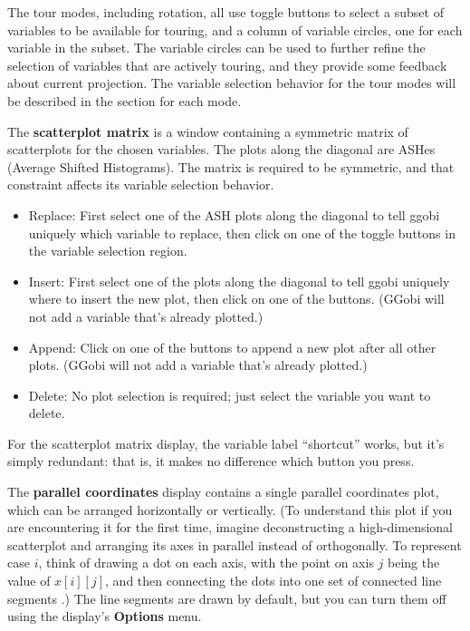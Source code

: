 \documentclass[11pt]{article}
\def\Widget#1{\textbf{#1}}
\begin{document}
The tour modes, including rotation, all use toggle buttons to select
a subset of variables to be available for touring, and a column of
variable circles, one for each variable in the subset.  The variable
circles can be used to further refine the selection of variables that are
actively touring, and they provide some feedback about current projection.
The variable selection behavior for the tour modes will be described in
the section for each mode.

The \Widget{scatterplot matrix} is a window containing a symmetric matrix
of scatterplots for the chosen variables.  The plots along the diagonal
are ASHes (Average Shifted Histograms).  The matrix is required to be
symmetric, and that constraint affects its variable selection behavior.

\begin{itemize}
\item Replace:  First select one of the ASH plots along the diagonal
  to tell ggobi uniquely which variable to replace, then click on
  one of the toggle buttons in the variable selection region.
\item Insert:  First select one of the plots along the
  diagonal to tell ggobi uniquely where to insert the new plot,
  then click on one of the buttons.  (GGobi will
  not add a variable that's already plotted.)
\item Append:  Click on one of the buttons to append
  a new plot after all other plots.  (GGobi will not add a variable
  that's already plotted.)
\item Delete:  No plot selection is required; just select the
  variable you want to delete.
\end{itemize}

For the scatterplot matrix display, the variable label ``shortcut''
works, but it's simply redundant: that is, it makes no difference which
button you press.


The \Widget{parallel coordinates} display contains a single parallel
coordinates plot, which can be arranged horizontally or vertically.
(To understand this plot if you are encountering it for the first
time, imagine deconstructing a high-dimensional scatterplot and
arranging its axes in parallel instead of orthogonally.  To represent
case $i$, think of drawing a dot on each axis,  with the point on
axis $j$ being the value of $x[i][j]$, and then connecting the dots
into one set of connected line segments \cite{In85,We90}.)  The line
segments are drawn by default, but you can turn them off using the
display's \Widget{Options} menu.
\end{document}
